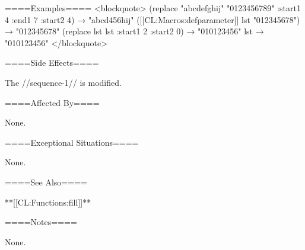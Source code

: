 ====Examples==== <blockquote> (replace "abcdefghij" "0123456789" :start1 4 :end1 7 :start2 4) → "abcd456hij" ([[CL:Macros:defparameter]] lst "012345678") → "012345678" (replace lst lst :start1 2 :start2 0) → "010123456" lst → "010123456" </blockquote>

====Side Effects====

The //sequence-1// is modified.

====Affected By====

None.

====Exceptional Situations====

None.

====See Also====

**[[CL:Functions:fill]]**

====Notes====

None.


 
